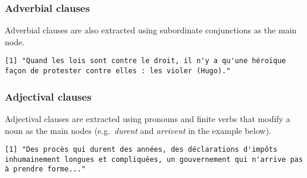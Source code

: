 \documentclass[
]{article}
\newenvironment{Shaded}{\begin{snugshade}}{\end{snugshade}}
\newcommand{\CommentTok}[1]{\textcolor[rgb]{0.56,0.35,0.01}{\textit{#1}}}
\newcommand{\DataTypeTok}[1]{\textcolor[rgb]{0.13,0.29,0.53}{#1}}
\newcommand{\KeywordTok}[1]{\textcolor[rgb]{0.13,0.29,0.53}{\textbf{#1}}}
\newcommand{\NormalTok}[1]{#1}
\newcommand{\OtherTok}[1]{\textcolor[rgb]{0.56,0.35,0.01}{#1}}
\newcommand{\StringTok}[1]{\textcolor[rgb]{0.31,0.60,0.02}{#1}}
\begin{document}
\hypertarget{advclause}{%
\subsubsection{Adverbial clauses}\label{advclause}}

Adverbial clauses are also extracted using subordinate conjunctions as
the main node.

\begin{verbatim}
[1] "Quand les lois sont contre le droit, il n'y a qu'une héroïque façon de protester contre elles : les violer (Hugo)."
\end{verbatim}

\begin{Shaded}
\end{Shaded}

\hypertarget{adjclause}{%
\subsubsection{Adjectival clauses}\label{adjclause}}

Adjectival clauses are extracted using pronouns and finite verbs that
modify a noun as the main nodes (e.g.~\emph{durent} and \emph{arrivent}
in the example below).

\begin{verbatim}
[1] "Des procès qui durent des années, des déclarations d'impôts inhumainement longues et compliquées, un gouvernement qui n'arrive pas à prendre forme..."
\end{verbatim}

\begin{Shaded}
\end{Shaded}
\end{document}
